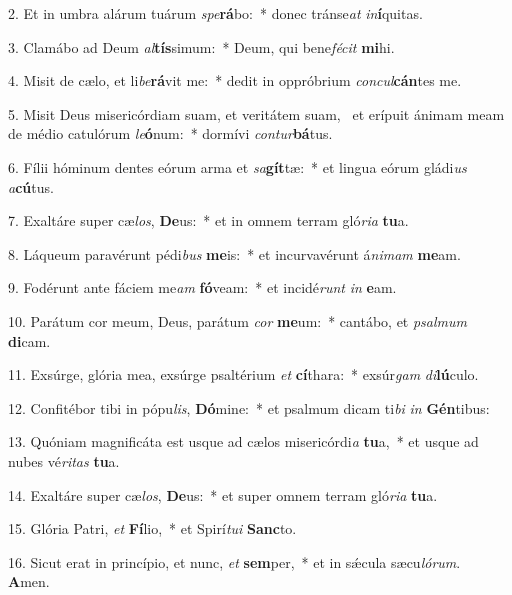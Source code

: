 2. Et in umbra alárum tuárum \textit{spe}\textbf{rá}bo:~*  donec tránse\textit{at} \textit{in}\textbf{í}quitas.\

3. Clamábo ad Deum \textit{al}\textbf{tís}simum:~*  Deum, qui bene\textit{fé}\textit{cit} \textbf{mi}hi.\

4. Misit de cælo, et li\textit{be}\textbf{rá}vit me:~*  dedit in oppróbrium \textit{con}\textit{cul}\textbf{cán}tes me.\

5. Misit Deus misericórdiam suam, et veritátem suam, \dag\  et erípuit ánimam meam de médio catulórum \textit{le}\textbf{ó}num:~*  dormívi \textit{con}\textit{tur}\textbf{bá}tus.\

6. Fílii hóminum dentes eórum arma et \textit{sa}\textbf{gít}tæ:~*  et lingua eórum gládi\textit{us} \textit{a}\textbf{cú}tus.\

7. Exaltáre super cæ\textit{los}, \textbf{De}us:~*  et in omnem terram gló\textit{ri}\textit{a} \textbf{tu}a.\

8. Láqueum paravérunt pédi\textit{bus} \textbf{me}is:~*  et incurvavérunt á\textit{ni}\textit{mam} \textbf{me}am.\

9. Fodérunt ante fáciem me\textit{am} \textbf{fó}veam:~*  et incidé\textit{runt} \textit{in} \textbf{e}am.\

10. Parátum cor meum, Deus, parátum \textit{cor} \textbf{me}um:~*  cantábo, et \textit{psal}\textit{mum} \textbf{di}cam.\

11. Exsúrge, glória mea, exsúrge psaltérium \textit{et} \textbf{cí}thara:~*  exsúr\textit{gam} \textit{di}\textbf{lú}culo.\

12. Confitébor tibi in pópu\textit{lis}, \textbf{Dó}mine:~*  et psalmum dicam ti\textit{bi} \textit{in} \textbf{Gén}tibus:\

13. Quóniam magnificáta est usque ad cælos misericórdi\textit{a} \textbf{tu}a,~*  et usque ad nubes vé\textit{ri}\textit{tas} \textbf{tu}a.\

14. Exaltáre super cæ\textit{los}, \textbf{De}us:~*  et super omnem terram gló\textit{ri}\textit{a} \textbf{tu}a.\

15. Glória Patri, \textit{et} \textbf{Fí}lio,~*  et Spirí\textit{tu}\textit{i} \textbf{Sanc}to.\

16. Sicut erat in princípio, et nunc, \textit{et} \textbf{sem}per,~*  et in sǽcula sæcu\textit{ló}\textit{rum}. \textbf{A}men.\

